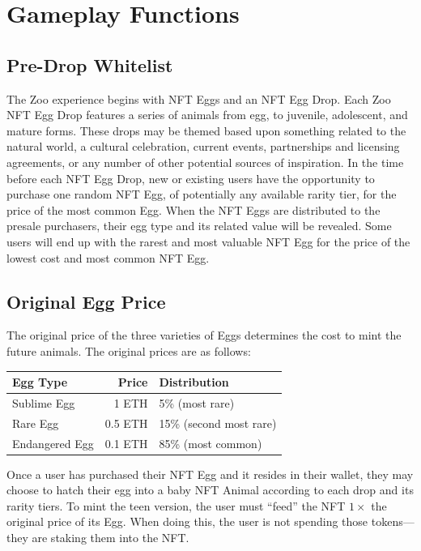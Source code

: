 \section{Gameplay Functions}

\subsection{Pre-Drop Whitelist}

The Zoo experience begins with NFT Eggs and an NFT Egg Drop. Each Zoo NFT Egg Drop features a series of animals from egg, to juvenile, adolescent, and mature forms. These drops may be themed based upon something related to the natural world, a cultural celebration, current events, partnerships and licensing agreements, or any number of other potential sources of inspiration. In the time before each NFT Egg Drop, new or existing users have the opportunity to purchase one random NFT Egg, of potentially any available rarity tier, for the price of the most common Egg. When the NFT Eggs are distributed to the presale purchasers, their egg type and its related value will be revealed. Some users will end up with the rarest and most valuable NFT Egg for the price of the lowest cost and most common NFT Egg.

\subsection{Original Egg Price}

The original price of the three varieties of Eggs determines the cost to mint the future animals. The original prices are as follows:

\begin{center}
\begin{tabular}{lrl}
\toprule
\textbf{Egg Type} & \textbf{Price} & \textbf{Distribution} \\
\midrule
Sublime Egg  & 1 ETH   & 5\% (most rare)   \\
Rare Egg     & 0.5 ETH & 15\% (second most rare) \\
Endangered Egg & 0.1 ETH & 85\% (most common) \\
\bottomrule
\end{tabular}
\end{center}

Once a user has purchased their NFT Egg and it resides in their wallet, they may choose to hatch their egg into a baby NFT Animal according to each drop and its rarity tiers. To mint the teen version, the user must ``feed'' the NFT $1\times$ the original price of its Egg. When doing this, the user is not spending those tokens---they are staking them into the NFT.


